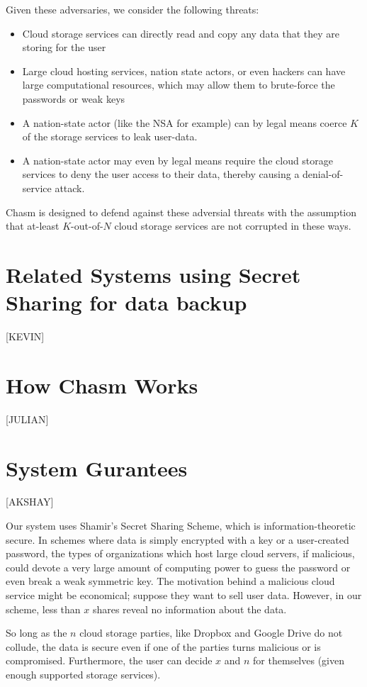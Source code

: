 \documentclass[letterpaper,twocolumn,10pt]{article}
\begin{document}
Given these adversaries, we consider the following threats:
\begin{itemize}
	\item Cloud storage services can directly read and copy any data that they are storing for the user
	\item Large cloud hosting services, nation state actors, or even hackers can have large computational resources, which may allow them to brute-force the passwords or weak keys
	\item A nation-state actor (like the NSA for example) can by legal means coerce $K$ of the storage services to leak user-data.
	\item A nation-state actor may even by legal means require the cloud storage services to deny the user access to their data, thereby causing a denial-of-service attack.

\end{itemize}
Chasm is designed to defend against these adversial threats with the assumption that at-least $K$-out-of-$N$ cloud storage services are not corrupted in these ways.

\section{Related Systems using Secret Sharing for data backup}
[KEVIN]


\section{How Chasm Works}
[JULIAN]

\section{System Gurantees}
[AKSHAY]

Our system uses Shamir's Secret Sharing Scheme, which is information-theoretic secure. In schemes where data is simply encrypted with a key or a user-created password, the types of organizations which host large cloud servers, if malicious, could devote a very large amount of computing power to guess the password or even break a weak symmetric key. The motivation behind a malicious cloud service might be economical; suppose they want to sell user data. However, in our scheme, less than $x$ shares reveal no information about the data.

So long as the $n$ cloud storage parties, like Dropbox and Google Drive do not collude, the data is secure even if one of the parties turns malicious or is compromised. Furthermore, the user can decide $x$ and $n$ for themselves (given enough supported storage services).
\end{document}
